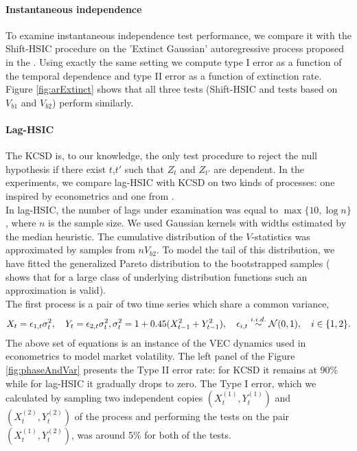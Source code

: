 \vspace{-4mm}
\paragraph{Instantaneous independence}
To examine instantaneous independence test performance, we compare it with the Shift-HSIC procedure \cite{chwialkowski2014kernel} on the 'Extinct Gaussian' autoregressive process proposed in the \cite[Section 4.1]{chwialkowski2014kernel}. Using exactly the same setting we compute type I error as a function of the temporal dependence and type II error as a function of extinction rate. Figure \ref{fig:arExtinct} shows that all three tests (Shift-HSIC and tests based on $V_{b1}$ and $V_{b2}$) perform similarly.   
\vspace{-0.2cm}
\paragraph{Lag-HSIC}
The KCSD  \cite{besserve_statistical_2013} is, to our knowledge, the only test procedure to reject the null hypothesis if there exist $t$,$t'$ such that $Z_t$ and $Z_{t'}$ are dependent. In the experiments, we compare lag-HSIC with KCSD on two kinds of processes: one  inspired by econometrics and one from \cite{besserve_statistical_2013}.\\ 
In lag-HSIC, the number of lags under examination was equal to $\max\{10,\log n\}$, where $n$ is the sample size. We used Gaussian kernels with widths estimated by the median heuristic. The cumulative distribution of the $V$-statistics was approximated by samples from $n V_{b2}$. To model the tail of this distribution, we have fitted the generalized Pareto distribution to the bootstrapped samples (\cite{pickands1975statistical} shows that for a large class of underlying distribution functions such an approximation is valid).\\
The first process is a pair of two time series which share a common variance,   
\begin{align}
\label{eq:dynamics2}
 X_t = \epsilon_{1,t} \sigma_t^2, \quad  Y_t = \epsilon_{2,t}  \sigma_t^2,  \sigma_t^2 = 1 + 0.45(X_{t-1}^2 + Y_{t-1}^2 ), \quad \epsilon_{i,t} \overset{i.i.d.}{\sim} \mathcal N(0,1), \quad i \in \{1,2\} .
\end{align}
The above set of equations is an instance of the VEC dynamics \cite{bauwens_multivariate_2006} used in econometrics to model market volatility. The left panel of the Figure \ref{fig:phaseAndVar} presents the Type II error rate: for KCSD it remains at 90\% while for lag-HSIC it gradually drops to zero. The Type I error, which we calculated by sampling two independent copies $(X^{(1)}_{t},Y^{(1)}_{t})$ and $(X^{(2)}_{t},Y^{(2)}_{t})$ of the process and performing the tests on the pair $(X^{(1)}_{t},Y^{(2)}_{t})$, was around 5\% for both of the tests.\\
